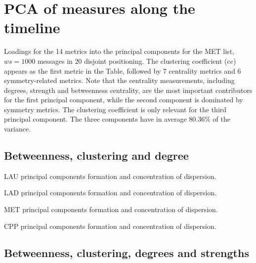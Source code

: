 \documentclass[%
 aip,
 jmp,%
 amsmath,amssymb,
 reprint,%
 floatfix,
]{revtex4-1}
\begin{document}
\FloatBarrier
\section{PCA of measures along the timeline}\label{sec:pcat}
Loadings for the 14 metrics into the principal components for the MET list, $ws=1000$ messages in 20 disjoint positioning. The clustering coefficient (cc) appears as the first metric in the Table, followed by 7 centrality metrics and 6 symmetry-related metrics. Note that the centrality measurements, including degrees, strength and betweenness centrality, are the most important contributors for the first principal component, while the second component is dominated by symmetry metrics. The clustering coefficient is only relevant for the third principal component. The three components have in average 80.36\% of the variance.
\subsection{Betweenness, clustering and degree}

\begin{table}[!h]
	\caption{LAU principal components formation and concentration of dispersion.}
	\footnotesize
	
\label{tab:pcain}
\end{table}

\begin{table}[!h]
	\caption{LAD principal components formation and concentration of dispersion.}
	\footnotesize
	
\label{tab:pcain}
\end{table}

\begin{table}[!h]
	\caption{MET principal components formation and concentration of dispersion.}
	\footnotesize
	
\label{tab:pcain}
\end{table}

\begin{table}[!h]
	\caption{CPP principal components formation and concentration of dispersion.}
	\footnotesize
	
\label{tab:pcain}
\end{table}

\FloatBarrier
\subsection{Betweenness, clustering, degrees and strengths}
\end{document}
